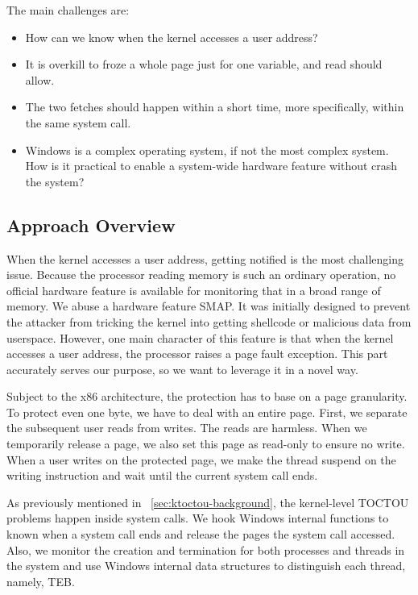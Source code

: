 The main challenges are:

\begin{itemize}
	\item How can we know when the kernel accesses a user address?
	\item It is overkill to froze a whole page just for one variable, and read should allow.
	\item The two fetches should happen within a short time, more specifically, within the same system call. 
	\item Windows is a complex operating system, if not the most complex system. How is it practical to enable a system-wide hardware feature without crash the system?
\end{itemize}


\subsection{Approach Overview}

When the kernel accesses a user address, getting notified is the most challenging issue. Because the processor reading memory is such an ordinary operation, no official hardware feature is available for monitoring that in a broad range of memory. We abuse a hardware feature SMAP. It was initially designed to prevent the attacker from tricking the kernel into getting shellcode or malicious data from userspace. However, one main character of this feature is that when the kernel accesses a user address, the processor raises a page fault exception. This part accurately serves our purpose, so we want to leverage it in a novel way.

Subject to the x86 architecture, the protection has to base on a page granularity. To protect even one byte, we have to deal with an entire page.
First, we separate the subsequent user reads from writes. The reads are harmless.  When we temporarily release a page, we also set this page as read-only to ensure no write. When a user writes on the protected page, we make the thread suspend on the writing instruction and wait until the current system call ends.

As previously mentioned in ~\autoref{sec:ktoctou-background}, the kernel-level TOCTOU problems happen inside system calls. We hook Windows internal functions to known when a system call ends and release the pages the system call accessed. Also, we monitor the creation and termination for both processes and threads in the system and use Windows internal data structures to distinguish each thread, namely, TEB.

